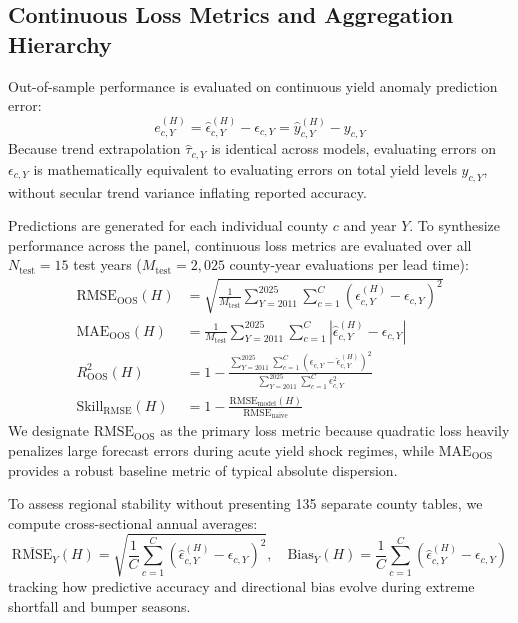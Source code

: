 \subsection{Continuous Loss Metrics and Aggregation Hierarchy}
\label{sec:meth_loss_metrics}

Out-of-sample performance is evaluated on continuous yield anomaly prediction error:
\begin{equation}
    e_{c,Y}^{(H)} = \hat{\epsilon}_{c,Y}^{(H)} - \epsilon_{c,Y} = \hat{y}_{c,Y}^{(H)} - y_{c,Y}
    \label{eq:anomaly_error_equality}
\end{equation}
Because trend extrapolation $\hat{\tau}_{c,Y}$ is identical across models, evaluating errors on $\epsilon_{c,Y}$ is mathematically equivalent to evaluating errors on total yield levels $y_{c,Y}$, without secular trend variance inflating reported accuracy.

Predictions are generated for each individual county $c$ and year $Y$. To synthesize performance across the panel, continuous loss metrics are evaluated over all $N_{\text{test}} = 15$ test years ($M_{\text{test}} = 2{,}025$ county-year evaluations per lead time):
\begin{align}
    \text{RMSE}_{\text{OOS}}(H) &= \sqrt{\frac{1}{M_{\text{test}}} \sum_{Y=2011}^{2025} \sum_{c=1}^C \left( \hat{\epsilon}_{c,Y}^{(H)} - \epsilon_{c,Y} \right)^2} \label{eq:rmse_oos} \\[1ex]
    \text{MAE}_{\text{OOS}}(H) &= \frac{1}{M_{\text{test}}} \sum_{Y=2011}^{2025} \sum_{c=1}^C \left| \hat{\epsilon}_{c,Y}^{(H)} - \epsilon_{c,Y} \right| \label{eq:mae_oos} \\[1ex]
    R^2_{\text{OOS}}(H) &= 1 - \frac{\sum_{Y=2011}^{2025} \sum_{c=1}^C \left( \epsilon_{c,Y} - \hat{\epsilon}_{c,Y}^{(H)} \right)^2}{\sum_{Y=2011}^{2025} \sum_{c=1}^C \epsilon_{c,Y}^2} \label{eq:r2_oos} \\[1ex]
    \text{Skill}_{\text{RMSE}}(H) &= 1 - \frac{\text{RMSE}_{\text{model}}(H)}{\text{RMSE}_{\text{naive}}} \label{eq:skill_score}
\end{align}
We designate $\text{RMSE}_{\text{OOS}}$ as the primary loss metric because quadratic loss heavily penalizes large forecast errors during acute yield shock regimes, while $\text{MAE}_{\text{OOS}}$ provides a robust baseline metric of typical absolute dispersion.

To assess regional stability without presenting 135 separate county tables, we compute cross-sectional annual averages:
\begin{equation}
    \overline{\text{RMSE}}_Y(H) = \sqrt{\frac{1}{C} \sum_{c=1}^C \left( \hat{\epsilon}_{c,Y}^{(H)} - \epsilon_{c,Y} \right)^2}, \quad
    \text{Bias}_Y(H) = \frac{1}{C} \sum_{c=1}^C \left( \hat{\epsilon}_{c,Y}^{(H)} - \epsilon_{c,Y} \right)
    \label{eq:annual_regional_metrics}
\end{equation}
tracking how predictive accuracy and directional bias evolve during extreme shortfall and bumper seasons.

